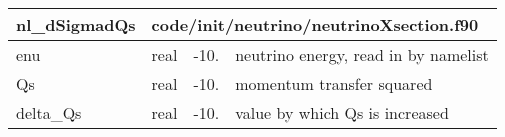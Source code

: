 \documentclass{article}
\begin{document}
\begin{longtable}{llll}
\toprule
\textbf{\large{nl\_dSigmadQs}} & \multicolumn{3}{l}{\footnotesize{code/init/neutrino/neutrinoXsection.f90}}\\*
\midrule
\endfirsthead
\midrule
\endhead
enu & \begin{minipage}[t]{2cm}real\end{minipage} & \begin{minipage}[t]{2cm}-10.\end{minipage} & \begin{minipage}[t]{12cm}neutrino energy, read in by namelist\end{minipage}\\*
\midrule
Qs & \begin{minipage}[t]{2cm}real\end{minipage} & \begin{minipage}[t]{2cm}-10.\end{minipage} & \begin{minipage}[t]{12cm}momentum transfer squared\end{minipage}\\*
\midrule
delta\_Qs & \begin{minipage}[t]{2cm}real\end{minipage} & \begin{minipage}[t]{2cm}-10.\end{minipage} & \begin{minipage}[t]{12cm}value by which Qs is increased\end{minipage}\\*
\bottomrule
\end{longtable}
{ }



\end{document}
